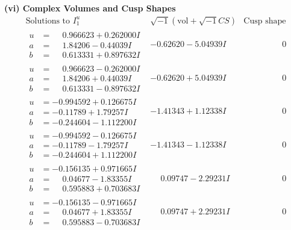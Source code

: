 \documentclass[1p]{elsarticle_modified}
\theoremstyle{definition}
\newcommand{\I}{\sqrt{-1}}
\begin{document}
\newpage\flushleft \textbf{(vi) Complex Volumes and Cusp Shapes}
$$\begin{array}{c|c|c}  
\text{Solutions to }I^u_{1}& \I (\text{vol} + \sqrt{-1}CS) & \text{Cusp shape}\\
 \hline 
\begin{aligned}
u &= \phantom{-}0.966623 + 0.262000 I \\
a &= \phantom{-}1.84206 - 0.44039 I \\
b &= \phantom{-}0.613331 + 0.897632 I\end{aligned}
 & -0.62620 - 5.04939 I & \phantom{-0.000000 } 0 \\ \hline\begin{aligned}
u &= \phantom{-}0.966623 - 0.262000 I \\
a &= \phantom{-}1.84206 + 0.44039 I \\
b &= \phantom{-}0.613331 - 0.897632 I\end{aligned}
 & -0.62620 + 5.04939 I & \phantom{-0.000000 } 0 \\ \hline\begin{aligned}
u &= -0.994592 + 0.126675 I \\
a &= -0.11789 + 1.79257 I \\
b &= -0.244604 - 1.112200 I\end{aligned}
 & -1.41343 + 1.12338 I & \phantom{-0.000000 } 0 \\ \hline\begin{aligned}
u &= -0.994592 - 0.126675 I \\
a &= -0.11789 - 1.79257 I \\
b &= -0.244604 + 1.112200 I\end{aligned}
 & -1.41343 - 1.12338 I & \phantom{-0.000000 } 0 \\ \hline\begin{aligned}
u &= -0.156135 + 0.971665 I \\
a &= \phantom{-}0.04677 - 1.83355 I \\
b &= \phantom{-}0.595883 + 0.703683 I\end{aligned}
 & \phantom{-}0.09747 - 2.29231 I & \phantom{-0.000000 } 0 \\ \hline\begin{aligned}
u &= -0.156135 - 0.971665 I \\
a &= \phantom{-}0.04677 + 1.83355 I \\
b &= \phantom{-}0.595883 - 0.703683 I\end{aligned}
 & \phantom{-}0.09747 + 2.29231 I & \phantom{-0.000000 } 0 \\ \hline\begin{aligned}

\end{aligned}
\end{array}$$
\end{document}
